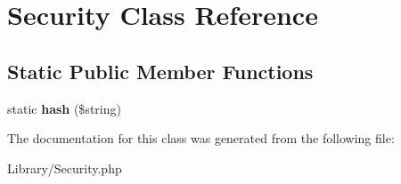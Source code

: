 \hypertarget{classSecurity}{
\section{Security Class Reference}
\label{classSecurity}
}
\subsection*{Static Public Member Functions}
\begin{DoxyCompactItemize}
\item 
\hypertarget{classSecurity_adcc0ad33133e434d1d0bd5883959f372}{
static {\bfseries hash} (\$string)}
\label{classSecurity_adcc0ad33133e434d1d0bd5883959f372}

\end{DoxyCompactItemize}


The documentation for this class was generated from the following file:\begin{DoxyCompactItemize}
\item 
Library/Security.php\end{DoxyCompactItemize}
